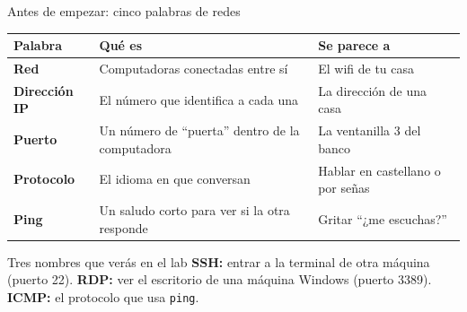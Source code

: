 \documentclass[aspectratio=169,10pt,c]{beamer}
\begin{document}
\begin{frame}{Antes de empezar: cinco palabras de redes}
\renewcommand{\arraystretch}{1.4}
\centering\small
\begin{tabular}{@{}p{2.6cm}p{5.4cm}p{4.8cm}@{}}
\toprule
\textbf{Palabra} & \textbf{Qué es} & \textbf{Se parece a}\\
\midrule
\textbf{Red} & Computadoras conectadas entre sí & El wifi de tu casa\\
\textbf{Dirección IP} & El número que identifica a cada una & La dirección de una casa\\
\textbf{Puerto} & Un número de ``puerta'' dentro de la computadora & La ventanilla 3 del banco\\
\textbf{Protocolo} & El idioma en que conversan & Hablar en castellano o por señas\\
\textbf{Ping} & Un saludo corto para ver si la otra responde & Gritar ``¿me escuchas?''\\
\bottomrule
\end{tabular}
\par\vspace{3mm}
\begin{exampleblock}{Tres nombres que verás en el lab}
\small \textbf{SSH:} entrar a la terminal de otra máquina (puerto 22). \textbf{RDP:} ver el escritorio de una máquina Windows (puerto 3389). \textbf{ICMP:} el protocolo que usa \texttt{ping}.
\end{exampleblock}
\end{frame}
\end{document}

